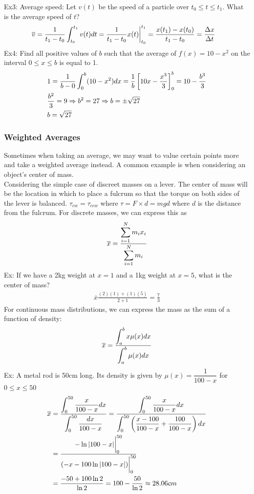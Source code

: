 \documentclass[11pt, fleqn]{article}
\begin{document}
Ex3: Average speed: Let $v(t)$ be the speed of a particle over $t_0\leq t\leq t_1$. What is the average speed of $t$?
\begin{align*}
    &\overline{v}=\frac{1}{t_1-t_0}\int_{t_0}^{t_1}v(t)dt={\frac{1}{t_1-t_0}x(t)}\bigg\vert_{t_0}^{t_1}=\frac{x(t_1)-x(t_0)}{t_1-t_0}=\frac{\Delta x}{\Delta t}
\end{align*}
Ex4: Find all positive values of $b$ such that the average of $f(x)=10-x^2$ on the interval $0\leq x\leq b$ is equal to 1.
\begin{align*}
    &1=\frac{1}{b-0}\int_0^b(10-x^2)dx=\frac{1}{b}\left[ 10x-\frac{x^3}{3} \right]_0^b=10-\frac{b^3}{3}\\
    &\frac{b^2}{3}=9\Rightarrow b^2=27\Rightarrow b=\pm\sqrt{27}\\
    &b=\sqrt{27}
\end{align*}
\subsubsection{Weighted Averages}
Sometimes when taking an average, we may want to value certain points more and take a weighted average instead. A common example is when considering an object's center of mass.\\
Considering the simple case of discreet masses on a lever. The center of mass will be the location in which to place a fulcrum so that the torque on both sides of the lever is balanced. $\tau_{cw}=\tau_{ccw}$ where $\tau=F\times d=mgd$ where $d$ is the distance from the fulcrum. For discrete masses, we can express this as
$$\overline{x}=\frac{\displaystyle\sum_{i=1}^Nm_ix_i}{\displaystyle\sum_{i=1}^Nm_i}$$
Ex: If we have a 2kg weight at $x=1$ and a 1kg weight at $x=5$, what is the center of mass?
\begin{align*}
    \overline{x}\frac{(2)(1)+(1)(5)}{2+1}=\frac{7}{3}
\end{align*}
For continuous mass distributions, we can express the mass as the sum of a function of density:
$$\overline{x}=\frac{\displaystyle\int_a^bx\mu(x)dx}{\displaystyle\int_a^b\mu(x)dx}$$
Ex: A metal rod is 50cm long. Its density is given by $\mu(x)=\dfrac{1}{100-x}$ for $0\leq x\leq 50$
\begin{align*}
    \overline{x}&=\frac{\displaystyle\int_0^{50}\frac{x}{100-x}dx}{\displaystyle\int_0^{50}\frac{dx}{100-x}}=\frac{\displaystyle\int_0^{50}\frac{x}{100-x}dx}{\displaystyle\int_0^{50}\left( \frac{x-100}{100-x}+\frac{100}{100-x} \right)dx}\\
    &=\frac{\displaystyle{-\ln|100-x|}\bigg\vert_0^{50}}{\displaystyle{\left( -x-100\ln|100-x| \right)}\bigg\vert_0^{50}}\\
    &=\frac{-50+100\ln 2}{\ln 2}=100-\frac{50}{\ln 2}\approx 28.06cm
\end{align*}
\end{document}
